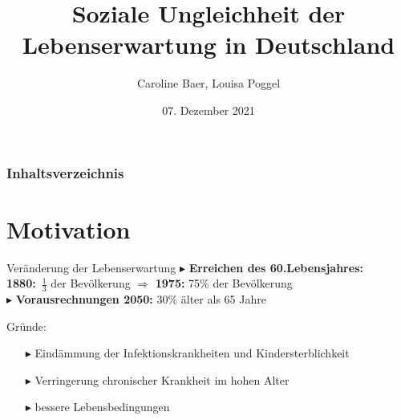 \documentclass{beamer}
\title[Soziale Ungleichheit in der Lebenserwartung]{\textbf{Soziale Ungleichheit der Lebenserwartung in Deutschland}}
\institute[]{Wissenschaftliches Arbeiten, TU Dortmund}
\author[Caroline Baer, Louisa Poggel]{Caroline Baer, Louisa Poggel}
\date{07. Dezember 2021}
\begin{document}
\begin{frame}
 \maketitle
\end{frame}

\begin{frame}
 \frametitle{Inhaltsverzeichnis}
  \tableofcontents  %
\end{frame}

\section{Motivation}

\begin{frame}{Veränderung der Lebenserwartung }
$\blacktriangleright$ \textbf{Erreichen des 60.Lebensjahres:}\\
 \vspace{0.4cm}
\hspace{0.5cm} \textbf{1880:}~$\frac{1}{3}$ der Bevölkerung       \hspace{0.5cm} $\Longrightarrow$ \hspace{0.5cm} \textbf{1975:} 75\% der Bevölkerung\\
 \vspace{0.6cm}
$\blacktriangleright$ \textbf{Vorausrechnungen 2050:} 30\% älter als 65 Jahre  
\vspace{0.2cm}
\pause
\begin{block}{Gründe:}
		\begin{itemize}
			\item[$\blacktriangleright$] Eindämmung der Infektionskrankheiten und Kindersterblichkeit
			\item[$\blacktriangleright$] Verringerung chronischer Krankheit im hohen Alter
			\item[$\blacktriangleright$] bessere Lebensbedingungen
		\end{itemize}
	\end{block}
\end{frame}
\end{document}
